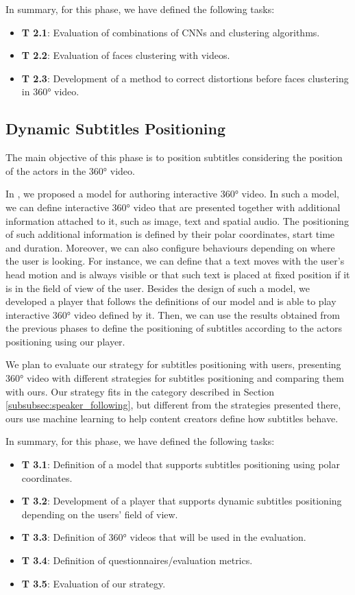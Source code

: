 In summary, for this phase, we have defined the following tasks:


\begin{itemize}
    \item \textbf{T 2.1}: Evaluation of combinations of CNNs and clustering algorithms.
    \item \textbf{T 2.2}: Evaluation of faces clustering with videos.
    \item \textbf{T 2.3}: Development of a method to correct distortions before faces clustering in 360° video.
\end{itemize}


\subsection{Dynamic Subtitles Positioning}

The main objective of this phase is to position subtitles considering the position of the actors in the 360° video.

In \cite{mendes_2020}, we proposed a model for authoring interactive 360° video. In such a model, we can define interactive 360° video that are presented together with additional information attached to it, such as image, text and spatial audio. The positioning of such additional information is defined by their polar coordinates, start time and duration. Moreover, we can also configure behaviours depending on where the user is looking. For instance, we can define that a text moves with the user's head motion and is always visible or that such text is placed at fixed position if it is in the field of view of the user. Besides the design of such a model, we developed a player that follows the definitions of our model and is able to play interactive 360° video defined by it. Then, we can use the results obtained from the previous phases to define the positioning of subtitles according to the actors positioning using our player.

We plan to evaluate our strategy for subtitles positioning with users, presenting 360° video with different strategies for subtitles positioning and comparing them with ours. Our strategy fits in the category described in Section \ref{subsubsec:speaker_following}, but different from the strategies presented there, ours use machine learning to help content creators define how subtitles behave.

In summary, for this phase, we have defined the following tasks:

\begin{itemize}
    \item \textbf{T 3.1}: Definition of a model that supports subtitles positioning using polar coordinates.
    \item \textbf{T 3.2}: Development of a player that supports dynamic subtitles positioning depending on the users' field of view.
    \item \textbf{T 3.3}: Definition of 360° videos that will be used in the evaluation.
    \item \textbf{T 3.4}: Definition of questionnaires/evaluation metrics.
    \item \textbf{T 3.5}: Evaluation of our strategy.
\end{itemize}
